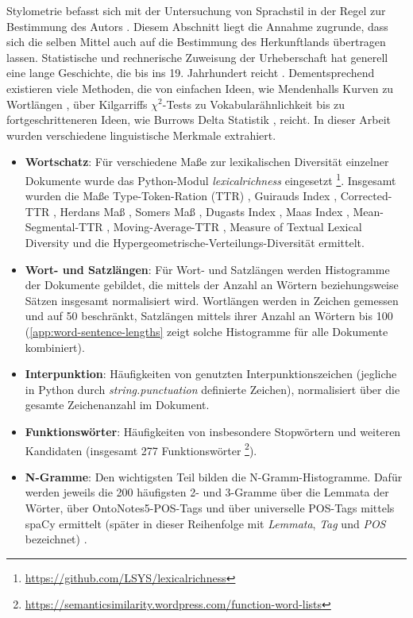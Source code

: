 \documentclass[bachelor,german]{info1thesis}
\begin{document}
Stylometrie befasst sich mit der Untersuchung von Sprachstil in der Regel zur Bestimmung des Autors \cite{Spillner1974}. Diesem Abschnitt liegt die Annahme zugrunde, dass sich die selben Mittel auch auf die Bestimmung des Herkunftlands übertragen lassen. Statistische und rechnerische Zuweisung der Urheberschaft hat generell eine lange Geschichte, die bis ins 19. Jahrhundert reicht \cite{Stamatatos2009}. Dementsprechend existieren viele Methoden, die von einfachen Ideen, wie Mendenhalls Kurven zu Wortlängen \cite{Mendenhall1887}, über Kilgarriffs $\chi^2$-Tests zu Vokabularähnlichkeit \cite{Kilgarriff2001} bis zu fortgeschritteneren Ideen, wie Burrows Delta Statistik \cite{Burrows2002}, reicht. In dieser Arbeit wurden verschiedene linguistische Merkmale extrahiert.
\begin{itemize}
\item \textbf{Wortschatz}: Für verschiedene Maße zur lexikalischen Diversität einzelner Dokumente wurde das Python-Modul \textit{lexicalrichness} eingesetzt \footnote{\url{https://github.com/LSYS/lexicalrichness}}. Insgesamt wurden die Maße Type-Token-Ration (TTR) \cite{Templin1957}, Guirauds Index \cite{Guiraud1954},  Corrected-TTR \cite{Carroll1964}, Herdans Maß \cite{Herdan1964}, Somers Maß \cite{Somers1966}, Dugasts Index \cite{Dugast1978}, Maas Index \cite{Maas1972}, Mean-Segmental-TTR \cite{Torruella2013}, Moving-Average-TTR \cite{Covington2010}, Measure of Textual Lexical Diversity  \cite{McCarthy2010} und die Hypergeometrische-Verteilungs-Diversität \cite{McCarthy2007} ermittelt.
\item \textbf{Wort- und Satzlängen}: Für Wort- und Satzlängen werden Histogramme der Dokumente gebildet, die mittels der Anzahl an Wörtern beziehungsweise Sätzen insgesamt normalisiert wird. Wortlängen werden in Zeichen gemessen und auf 50 beschränkt, Satzlängen mittels ihrer Anzahl an Wörtern bis 100 (\autoref{app:word-sentence-lengths} zeigt solche Histogramme für alle Dokumente kombiniert).
\item \textbf{Interpunktion}: Häufigkeiten von genutzten Interpunktionszeichen (jegliche in Python durch \textit{string.punctuation} definierte Zeichen), normalisiert über die gesamte Zeichenanzahl im Dokument.
\item \textbf{Funktionswörter}: Häufigkeiten von insbesondere Stopwörtern und weiteren Kandidaten (insgesamt 277 Funktionswörter \footnote{\url{https://semanticsimilarity.wordpress.com/function-word-lists}}).
\item \textbf{N-Gramme}: Den wichtigsten Teil bilden die N-Gramm-Histogramme. Dafür werden jeweils die 200 häufigsten 2- und 3-Gramme über die Lemmata der Wörter, über OntoNotes5-POS-Tags und über universelle POS-Tags mittels spaCy ermittelt (später in dieser Reihenfolge mit \textit{Lemmata}, \textit{Tag} und \textit{POS} bezeichnet) \cite{RalphWeischedel2013}.
\end{itemize}
\end{document}
